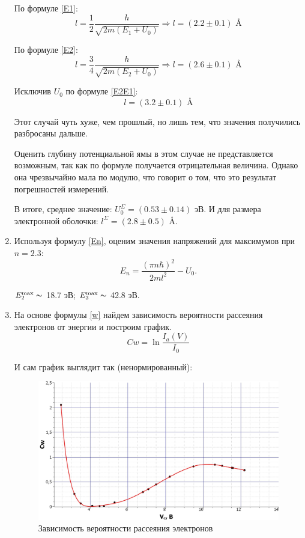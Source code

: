 \documentclass[12pt,a4paper]{article}
\begin{document}
\begin{enumerate}
		По формуле \eqref{E1}:
		\begin{equation*}
			l = \frac{1}{2}\frac{h}{\sqrt{2m(E_1 + U_0)}} \Longrightarrow l = (2.2 \pm 0.1) \text{ \AA}
		\end{equation*}
		
		По формуле \eqref{E2}:
		\begin{equation*}
			l = \frac{3}{4}\frac{h}{\sqrt{2m(E_2 + U_0)}} \Longrightarrow l = (2.6 \pm 0.1) \text{ \AA}
		\end{equation*}
		
		Исключив $U_0$ по формуле \eqref{E2E1}:
		\begin{equation*}
			l = (3.2 \pm 0.1) \text{ \AA}
		\end{equation*}
		
		Этот случай чуть хуже, чем прошлый, но лишь тем, что значения получились разбросаны дальше.
		
		Оценить глубину потенциальной ямы в этом случае не представляется возможным, так как по формуле получается отрицательная величина. Однако она чрезвычайно мала по модулю, что говорит о том, что это результат погрешностей измерений.
	
		В итоге, среднее значение: $U_0^\Sigma = (0.53 \pm 0.14)$ эВ.
		И для размера электронной оболочки: $l^\Sigma = (2.8 \pm 0.5)$ \AA.
	
	
		\item Используя формулу \eqref{En}, оценим значения напряжений для максимумов при $n = 2.3$:
		\begin{equation*}
			E_n = \frac{(\pi n \hbar)^2}{2ml^2} - U_0.
		\end{equation*}
	
		$E_2^\text{max} \thicksim $ 18.7 эВ; $E_3^\text{max} \thicksim $ 42.8 эВ. 
	
		\item На основе формулы \eqref{w} найдем зависимость вероятности рассеяния электронов от энергии и построим график.
		\begin{equation*}
			Cw = \ln\frac{I_a(V)}{I_0}
		\end{equation*}
		
		И сам график выглядит так (ненормированный):
		\begin{figure}[h!]
			\centering
			\includegraphics[width=\linewidth]{src/Cw(V).jpg}
			\caption{Зависимость вероятности рассеяния электронов}
		\end{figure}
	
	\end{enumerate}
\end{document}
